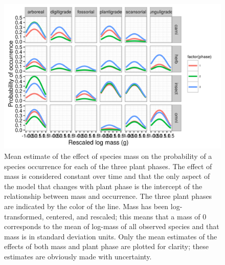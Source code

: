 \documentclass[12pt,letterpaper]{article}
\begin{document}
\begin{figure}[ht]
  \centering
  \includegraphics[width=\textwidth,height=0.5\textheight,keepaspectratio=true]{figure/mass_on_pres}
  \caption[Effect of mass on probability of species occurrence as estimated from the pure-presence model]{Mean estimate of the effect of species mass on the probability of a species occurrence for each of the three plant phases. The effect of mass is considered constant over time and that the only aspect of the model that changes with plant phase is the intercept of the relationship between mass and occurrence. The three plant phases are indicated by the color of the line. Mass has been log-transformed, centered, and rescaled; this means that a mass of 0 corresponds to the mean of log-mass of all observed species and that mass is in standard deviation units. Only the mean estimates of the effects of both mass and plant phase are plotted for clarity; these estimates are obviously made with uncertainty.}
  \label{fig:mass_occur}
\end{figure}
\end{document}
